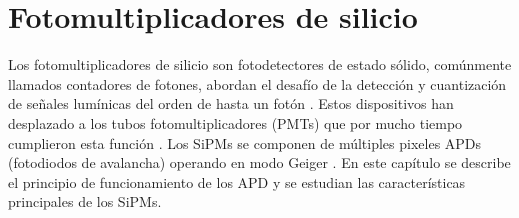 
\chapter{Fotomultiplicadores de silicio}
\label{Cap:MarcoT}
Los fotomultiplicadores de silicio son fotodetectores de estado sólido, comúnmente llamados contadores de fotones, abordan el desafío de la detección y cuantización de señales lumínicas del orden de hasta un fotón \citep{Intro_SIPM_Sensl}. Estos dispositivos han desplazado a los tubos fotomultiplicadores (PMTs) que por mucho tiempo cumplieron esta función \citep{MPPC_note}. Los SiPMs se componen de múltiples pixeles APDs (fotodiodos de avalancha) operando en modo Geiger \citep{Apd_Hamamatsu}. En este capítulo se describe el principio de funcionamiento de los APD y se estudian las características principales de los SiPMs.
